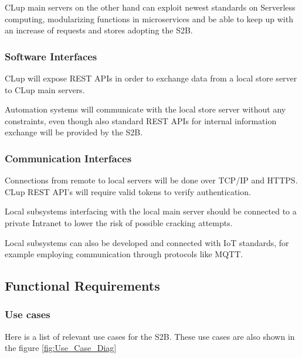 CLup main servers on the other hand can exploit newest standards on Serverless computing, modularizing functions in microservices and be able to keep up with an increase of requests and stores adopting the S2B.
\vfill


\subsubsection{Software Interfaces}
CLup will expose REST APIs in order to exchange data from a local store server to CLup main servers.

Automation systems will communicate with the local store server without any constraints, even though also standard REST APIs for internal information exchange will be provided by the S2B.

\subsubsection{Communication Interfaces}

Connections from remote to local servers will be done over TCP/IP and HTTPS.
CLup REST API's will require valid tokens to verify authentication.

Local subsystems interfacing with the local main server should be connected to a private Intranet to lower the risk of possible cracking attempts.

Local subsystems can also be developed and connected with IoT standards, for example employing communication through protocols like MQTT.

\subsection{Functional Requirements}
\subsubsection{Use cases}
Here is a list of relevant use cases for the S2B. These use cases are also shown in the figure \ref{fig:Use_Case_Diag}
\smallskip

